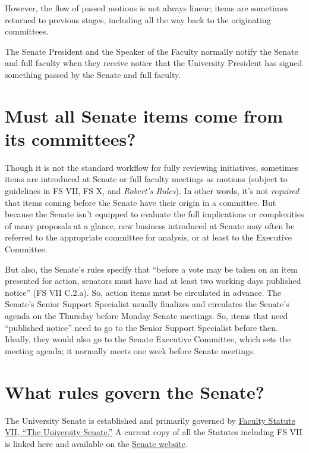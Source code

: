 \documentclass[12pt]{article}
\begin{document}
However, the flow of passed motions is not always linear; items are
sometimes returned to previous stages, including all the way back to the
originating committees.

The Senate President and the Speaker of the Faculty normally notify the
Senate and full faculty when they receive notice that the University
President has signed something passed by the Senate and full faculty.

\section{Must all Senate items come from its
committees?}\label{must-all-senate-items-come-from-its-committees}

Though it is not the standard workflow for fully reviewing initiatives,
sometimes items are introduced at Senate or full faculty meetings as
motions (subject to guidelines in FS VII, FS X, and \emph{Robert's
Rules}). In other words, it's not \emph{required} that items coming
before the Senate have their origin in a committee. But because the
Senate isn't equipped to evaluate the full implications or complexities
of many proposals at a glance, new business introduced at Senate may
often be referred to the appropriate committee for analysis, or at least
to the Executive Committee.

But also, the Senate's rules specify that ``before a vote may be taken
on an item presented for action, senators must have had at least two
working days published notice'' (FS VII C.2.a). So, action items must be
circulated in advance. The Senate's Senior Support Specialist usually
finalizes and circulates the Senate's agenda on the Thursday before
Monday Senate meetings. So, items that need ``published notice'' need to
go to the Senior Support Specialist before then. Ideally, they would
also go to the Senate Executive Committee, which sets the meeting
agenda; it normally meets one week before Senate meetings.

\section{What rules govern the
Senate?}\label{what-rules-govern-the-senate}

The University Senate is established and primarily governed by
\href{https://www.hofstra.edu/sites/default/files/2024-04/facultystatutes.pdf}{Faculty
Statute VII, ``The University Senate.''} A current copy of all the
Statutes including FS VII is linked here and available on the
\href{https://www.hofstra.edu/senate/}{Senate website}.
\end{document}
